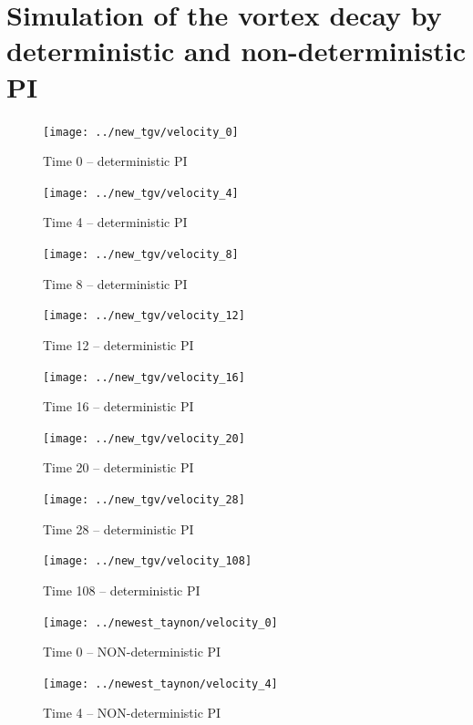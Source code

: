 \section{Simulation of the vortex decay by deterministic and non-deterministic PI}

\begin{figure}[H]
 \centering 
 \texttt{[image: ../new\_tgv/velocity\_0]}
 \label{transitions}
 \caption{Time 0 -- deterministic PI}
\end{figure}
\begin{figure}[H]
 \centering 
 \texttt{[image: ../new\_tgv/velocity\_4]}
 \label{transitions}
 \caption{Time 4 -- deterministic PI}
\end{figure}

\begin{figure}[H]
 \centering 
 \texttt{[image: ../new\_tgv/velocity\_8]}
 \label{transitions}
 \caption{Time 8 -- deterministic PI}
\end{figure}

\begin{figure}[H]
 \centering 
 \texttt{[image: ../new\_tgv/velocity\_12]}
 \label{transitions}
 \caption{Time 12 -- deterministic PI}
\end{figure}


\begin{figure}[H]
 \centering 
 \texttt{[image: ../new\_tgv/velocity\_16]}
 \label{transitions}
 \caption{Time 16 -- deterministic PI}
\end{figure}

\begin{figure}[H]
 \centering 
 \texttt{[image: ../new\_tgv/velocity\_20]}
 \label{transitions}
 \caption{Time 20 -- deterministic PI}
\end{figure}


\begin{figure}[H]
 \centering 
 \texttt{[image: ../new\_tgv/velocity\_28]}
 \label{transitions}
 \caption{Time 28 -- deterministic PI}
\end{figure}


\begin{figure}[H]
 \centering 
 \texttt{[image: ../new\_tgv/velocity\_108]}
 \label{transitions}
 \caption{Time 108 -- deterministic PI}
\end{figure}


\begin{figure}[H]
 \centering 
 \texttt{[image: ../newest\_taynon/velocity\_0]}
 \label{transitions}
 \caption{Time 0 -- NON-deterministic PI}
\end{figure}
\begin{figure}[H]
 \centering 
 \texttt{[image: ../newest\_taynon/velocity\_4]}
 \label{transitions}
 \caption{Time 4 -- NON-deterministic PI}
\end{figure}

